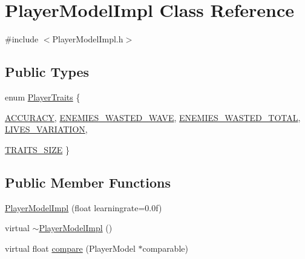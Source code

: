 \hypertarget{class_player_model_impl}{
\section{PlayerModelImpl Class Reference}
\label{d5/da9/class_player_model_impl}
}


{\ttfamily \#include $<$PlayerModelImpl.h$>$}

\subsection*{Public Types}
\begin{DoxyCompactItemize}
\item 
enum \hyperlink{class_player_model_impl_a109778d2250dda6ff69a6357e6e6cecb}{PlayerTraits} \{ \par
\hyperlink{class_player_model_impl_a109778d2250dda6ff69a6357e6e6cecba68670e73549e2e08801b3f4fd8813ad8}{ACCURACY}, 
\hyperlink{class_player_model_impl_a109778d2250dda6ff69a6357e6e6cecba45fd1bb96522c55a0f99c0a204aaa8c2}{ENEMIES\_\-WASTED\_\-WAVE}, 
\hyperlink{class_player_model_impl_a109778d2250dda6ff69a6357e6e6cecbaa8057f1393b6f1def858483e12c083e8}{ENEMIES\_\-WASTED\_\-TOTAL}, 
\hyperlink{class_player_model_impl_a109778d2250dda6ff69a6357e6e6cecba84e772baa6b5084534ce30612ca0bbd2}{LIVES\_\-VARIATION}, 
\par
\hyperlink{class_player_model_impl_a109778d2250dda6ff69a6357e6e6cecba850a60bb3a4799bad534687ae749bba4}{TRAITS\_\-SIZE}
 \}
\end{DoxyCompactItemize}
\subsection*{Public Member Functions}
\begin{DoxyCompactItemize}
\item 
\hyperlink{class_player_model_impl_ab6b1be2891d1da52180365db53756000}{PlayerModelImpl} (float learningrate=0.0f)
\item 
virtual \hyperlink{class_player_model_impl_a3e431c4e0d19dd32c5005ab77e26f4ac}{$\sim$PlayerModelImpl} ()
\item 
virtual float \hyperlink{class_player_model_impl_a05ab9583f581c1b89cd48b1e14f52bc1}{compare} (PlayerModel $\ast$comparable)
\end{DoxyCompactItemize}


